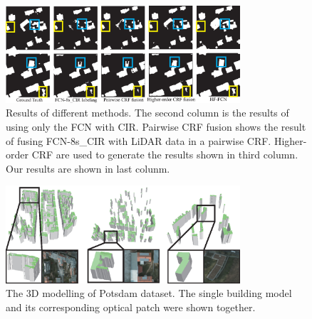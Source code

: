 \begin{figure}
\centering
\includegraphics[width=8.7cm]{Figures/Potsdam_compared_results.eps}
\caption{Results of different methods. The second column is the results of using only the FCN with CIR. Pairwise CRF fusion shows the result of fusing FCN-8s\_CIR with LiDAR data in a pairwise CRF. Higher-order CRF are used to generate the results shown in third column. Our results are shown in last colunm.}
\label{17}
\end{figure}

\begin{figure}
\centering
\includegraphics[width=8.7cm]{Figures/potsdam_models.eps}
\caption{The 3D modelling of Potsdam dataset. The single building model and its corresponding optical patch were shown together.}
\label{18}
\end{figure}
